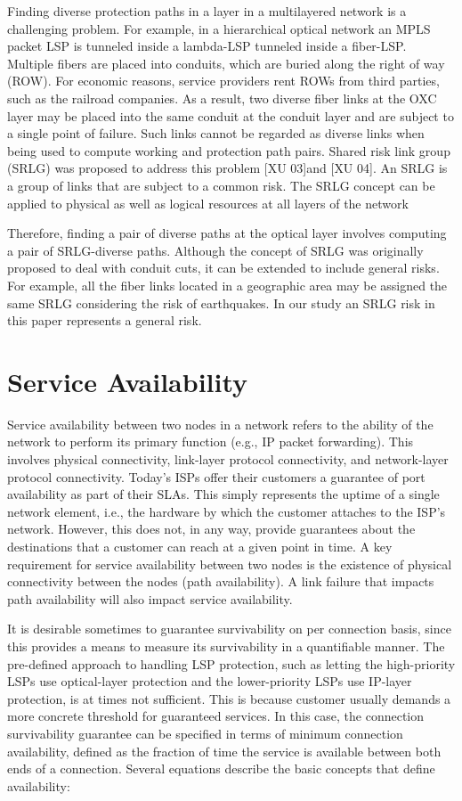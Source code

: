 Finding diverse protection paths in a layer in a multilayered network
is a challenging problem. For example, in a hierarchical optical network
an MPLS packet LSP is tunneled inside a lambda-LSP tunneled inside
a fiber-LSP. Multiple fibers are placed into conduits, which are buried
along the right of way (ROW). For economic reasons, service providers
rent ROWs from third parties, such as the railroad companies. As a
result, two diverse fiber links at the OXC layer may be placed into
the same conduit at the conduit layer and are subject to a single
point of failure. Such links cannot be regarded as diverse links when
being used to compute working and protection path pairs. Shared risk
link group (SRLG) was proposed to address this problem {[}XU 03]and
{[}XU 04]. An SRLG is a group of links that are subject to a common
risk. The SRLG concept can be applied to physical as well as logical
resources at all layers of the network

Therefore, finding a pair of diverse paths at the optical layer involves
computing a pair of SRLG-diverse paths. Although the concept of SRLG
was originally proposed to deal with conduit cuts, it can be extended
to include general risks. For example, all the fiber links located
in a geographic area may be assigned the same SRLG considering the
risk of earthquakes. In our study an SRLG risk in this paper represents
a general risk.


\section{Service Availability}

Service availability between two nodes in a network refers to the
ability of the network to perform its primary function (e.g., IP packet
forwarding). This involves physical connectivity, link-layer protocol
connectivity, and network-layer protocol connectivity. Today's ISPs
offer their customers a guarantee of port availability as part of
their SLAs. This simply represents the uptime of a single network
element, i.e., the hardware by which the customer attaches to the
ISP's network. However, this does not, in any way, provide guarantees
about the destinations that a customer can reach at a given point
in time. A key requirement for service availability between two nodes
is the existence of physical connectivity between the nodes (path
availability). A link failure that impacts path availability will
also impact service availability.

It is desirable sometimes to guarantee survivability on per connection
basis, since this provides a means to measure its survivability in
a quantifiable manner. The pre-defined approach to handling LSP protection,
such as letting the high-priority LSPs use optical-layer protection
and the lower-priority LSPs use IP-layer protection, is at times not
sufficient. This is because customer usually demands a more concrete
threshold for guaranteed services. In this case, the connection survivability
guarantee can be specified in terms of minimum connection availability,
defined as the fraction of time the service is available between both
ends of a connection. Several equations describe the basic concepts
that define availability:

